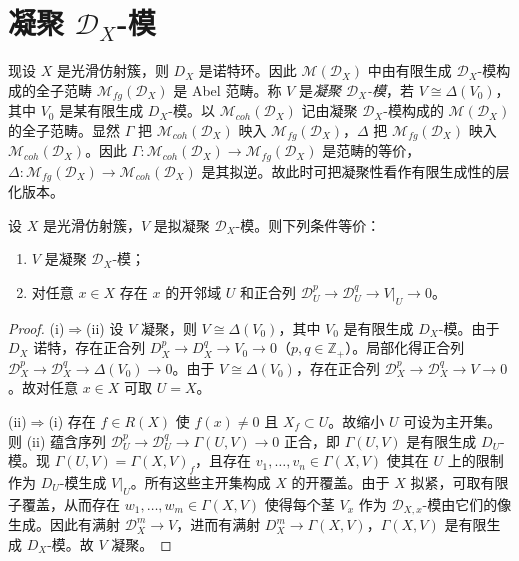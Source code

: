 \section{凝聚 $\mathcal{D}_X$-模}

现设 $X$ 是光滑仿射簇，则 $D_X$ 是诺特环。因此 $\mathcal{M}(\mathcal{D}_X)$ 中由有限生成 $\mathcal{D}_X$-模构成的全子范畴 $\mathcal{M}_{fg}(\mathcal{D}_X)$ 是 Abel 范畴。称 $V$ 是\emph{凝聚 $\mathcal{D}_X$-模}，若 $V\cong\Delta(V_0)$，其中 $V_0$ 是某有限生成 $D_X$-模。以 $\mathcal{M}_{coh}(\mathcal{D}_X)$ 记由凝聚 $\mathcal{D}_X$-模构成的 $\mathcal{M}(\mathcal{D}_X)$ 的全子范畴。显然 $\Gamma$ 把 $\mathcal{M}_{coh}(\mathcal{D}_X)$ 映入 $\mathcal{M}_{fg}(\mathcal{D}_X)$，$\Delta$ 把 $\mathcal{M}_{fg}(\mathcal{D}_X)$ 映入 $\mathcal{M}_{coh}(\mathcal{D}_X)$。因此 $\Gamma:\mathcal{M}_{coh}(\mathcal{D}_X)\to\mathcal{M}_{fg}(\mathcal{D}_X)$ 是范畴的等价，$\Delta:\mathcal{M}_{fg}(\mathcal{D}_X)\to\mathcal{M}_{coh}(\mathcal{D}_X)$ 是其拟逆。故此时可把凝聚性看作有限生成性的层化版本。

\begin{lemma}
设 $X$ 是光滑仿射簇，$V$ 是拟凝聚 $\mathcal{D}_X$-模。则下列条件等价：
\begin{enumerate}[label=(\roman*)]
  \item $V$ 是凝聚 $\mathcal{D}_X$-模；
  \item 对任意 $x\in X$ 存在 $x$ 的开邻域 $U$ 和正合列 $\mathcal{D}_U^p\to\mathcal{D}_U^q\to V|_U\to 0$。
\end{enumerate}
\end{lemma}

\begin{proof}
(i)$\Rightarrow$(ii) 设 $V$ 凝聚，则 $V\cong\Delta(V_0)$，其中 $V_0$ 是有限生成 $D_X$-模。由于 $D_X$ 诺特，存在正合列 $D_X^p\to D_X^q\to V_0\to 0$（$p,q\in\mathbb{Z}_+$）。局部化得正合列 $\mathcal{D}_X^p\to\mathcal{D}_X^q\to\Delta(V_0)\to 0$。由于 $V\cong\Delta(V_0)$，存在正合列 $\mathcal{D}_X^p\to\mathcal{D}_X^q\to V\to 0$。故对任意 $x\in X$ 可取 $U=X$。

(ii)$\Rightarrow$(i) 存在 $f\in R(X)$ 使 $f(x)\neq 0$ 且 $X_f\subset U$。故缩小 $U$ 可设为主开集。则 (ii) 蕴含序列 $\mathcal{D}_U^p\to\mathcal{D}_U^q\to\Gamma(U,V)\to 0$ 正合，即 $\Gamma(U,V)$ 是有限生成 $D_U$-模。现 $\Gamma(U,V)=\Gamma(X,V)_f$，且存在 $v_1,\dots,v_n\in\Gamma(X,V)$ 使其在 $U$ 上的限制作为 $D_U$-模生成 $V|_U$。所有这些主开集构成 $X$ 的开覆盖。由于 $X$ 拟紧，可取有限子覆盖，从而存在 $w_1,\dots,w_m\in\Gamma(X,V)$ 使得每个茎 $V_x$ 作为 $\mathcal{D}_{X,x}$-模由它们的像生成。因此有满射 $\mathcal{D}_X^m\to V$，进而有满射 $D_X^m\to\Gamma(X,V)$，$\Gamma(X,V)$ 是有限生成 $D_X$-模。故 $V$ 凝聚。
\end{proof}

